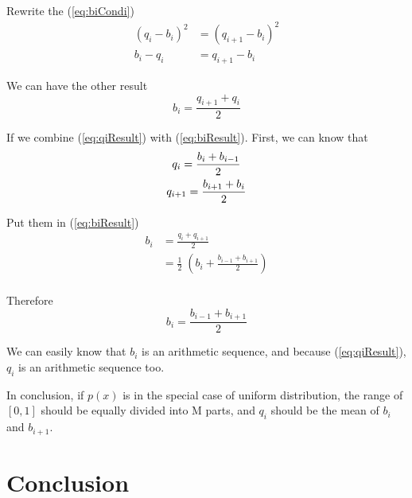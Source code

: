 \documentclass{article}
\begin{document}
Rewrite the (\ref{eq:biCondi}) 
\begin{equation*}
	\begin{aligned}
		(q_i - b_i)^2 &= (q_{i + 1} - b_i)^2 \\ 
		b_i - q_i &= q_{i + 1} - b_i
	\end{aligned}
\end{equation*}

We can have the other result
\begin{equation}
	b_i = \frac{q_{i + 1} + q_i}{2}
	\label{eq:biResult}
\end{equation}

If we combine (\ref{eq:qiResult}) with (\ref{eq:biResult}). First, we can know that 
\begin{gather}
	q_i = \frac{b_i + b_{i - 1}}{2} \notag \\ 
	q_{i + 1} = \frac{b_{i + 1} + b_i}{2} \notag
\end{gather}

Put them in (\ref{eq:biResult})
\begin{equation*}
	\begin{aligned}
		b_i &= \frac{q_i + q_{i + 1}}{2} \\ 
		&= \frac{1}{2} \; (b_i + \frac{b_{i - 1} + b_{i + 1}}{2}) \\ 
	\end{aligned}
\end{equation*}

Therefore
$$
	b_i = \frac{b_{i - 1} + b_{i + 1}}{2}
$$

We can easily know that $b_i$ is an arithmetic sequence, and because (\ref{eq:qiResult}), $q_i$ is an arithmetic sequence too. 

In conclusion, if $p(x)$ is in the special case of uniform distribution, the range of $[0, 1]$ should be equally divided into M parts, and $q_i$ should be the mean of $b_i$ and $b_{i + 1}$.

\section{Conclusion}






\begin{appendices}

\end{appendices}
\end{document}

